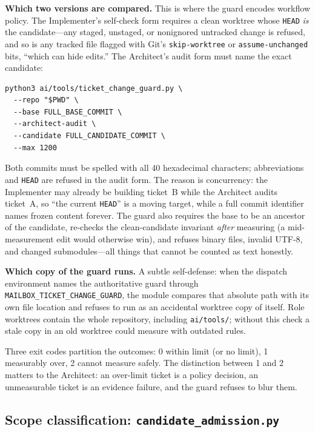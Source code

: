 \documentclass[10pt,aps,prd,twocolumn,nofootinbib]{revtex4-2}
\newcommand{\code}[1]{\texttt{#1}}
\newcommand{\file}[1]{\texttt{#1}}
\begin{document}
\textbf{Which two versions are compared.}  This is where the guard
encodes workflow policy.  The Implementer's self-check form requires a
clean worktree whose \code{HEAD} \emph{is} the candidate---any staged,
unstaged, or nonignored untracked change is refused, and so is any
tracked file flagged with Git's \code{skip-worktree} or
\code{assume-unchanged} bits, ``which can hide edits.''  The
Architect's audit form must name the exact candidate:

\begin{verbatim}
python3 ai/tools/ticket_change_guard.py \
  --repo "$PWD" \
  --base FULL_BASE_COMMIT \
  --architect-audit \
  --candidate FULL_CANDIDATE_COMMIT \
  --max 1200
\end{verbatim}

Both commits must be spelled with all 40 hexadecimal characters;
abbreviations and \code{HEAD} are refused in the audit form.  The
reason is concurrency: the Implementer may already be building ticket~B
while the Architect audits ticket~A, so ``the current \code{HEAD}'' is
a moving target, while a full commit identifier names frozen content
forever.  The guard also requires the base to be an ancestor of the
candidate, re-checks the clean-candidate invariant \emph{after}
measuring (a mid-measurement edit would otherwise win), and refuses
binary files, invalid UTF-8, and changed submodules---all things that
cannot be counted as text honestly.

\textbf{Which copy of the guard runs.}  A subtle self-defense: when the
dispatch environment names the authoritative guard through
\code{MAILBOX\_TICKET\_CHANGE\_GUARD}, the module compares that
absolute path with its own file location and refuses to run as an
accidental worktree copy of itself.  Role worktrees contain the whole
repository, including \file{ai/tools/}; without this check a stale
copy in an old worktree could measure with outdated rules.

Three exit codes partition the outcomes: 0 within limit (or no limit),
1 measurably over, 2 cannot measure safely.  The distinction between 1
and 2 matters to the Architect: an over-limit ticket is a policy
decision, an unmeasurable ticket is an evidence failure, and the guard
refuses to blur them.

\subsection{Scope classification: \file{candidate\_admission.py}}
\label{sec:admission}
\end{document}

